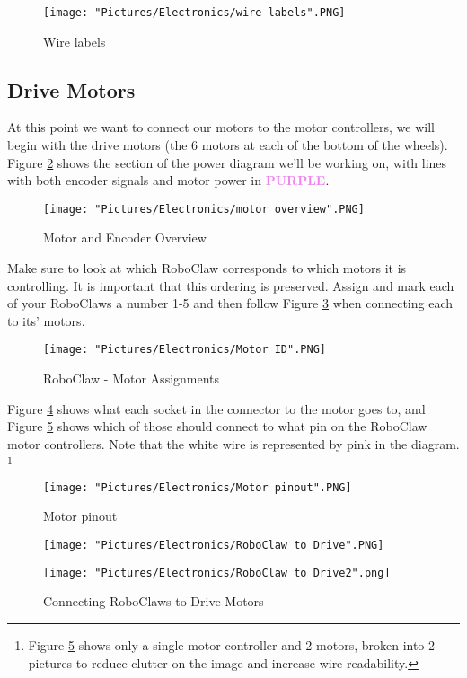 \documentclass[12pt]{article}
\begin{document}
\begin{figure}[H]
 	\centering
	\texttt{[image: "Pictures/Electronics/wire labels".PNG]}
 	\caption{Wire labels}
	\label{wire lengths}
\end{figure}

\subsection{Drive Motors}
At this point we want to connect our motors to the motor controllers, we will begin with the drive motors (the 6 motors at each of the bottom of the wheels). Figure \ref{motors over} shows the section of the power diagram we'll be working on, with lines with both encoder signals and motor power in \textcolor{violet}{\textbf{PURPLE}}.

\begin{figure}[H]
  	\centering
    	\texttt{[image: "Pictures/Electronics/motor overview".PNG]}
 	\caption{Motor and Encoder Overview}
	\label{motors over}
\end{figure}


\noindent Make sure to look at which RoboClaw corresponds to which motors it is controlling. It is important that this ordering is preserved. Assign and mark each of your RoboClaws a number 1-5 and then follow Figure \ref{motorID} when connecting each to its' motors. 

\begin{figure}[H]
 	\centering
	\texttt{[image: "Pictures/Electronics/Motor ID".PNG]}
 	\caption{RoboClaw - Motor Assignments}
	\label{motorID}
\end{figure}

Figure \ref{Motor pinout} shows what each socket in the connector to the motor goes to, and Figure \ref{RC to Drive} shows which of those should connect to what pin on the RoboClaw motor controllers. Note that the white wire is represented by pink in the diagram. \footnote{Figure \ref{RC to Drive} shows only a single motor controller and 2 motors, broken into 2 pictures to reduce clutter on the image and increase wire readability.} 

\begin{figure}[H]
 	\centering
	\texttt{[image: "Pictures/Electronics/Motor pinout".PNG]}
 	\caption{Motor pinout}
	\label{Motor pinout}
\end{figure}


\begin{figure}[H]
 	\centering
  	\begin{minipage}[b]{0.475\textwidth}
		\texttt{[image: "Pictures/Electronics/RoboClaw to Drive".PNG]}
  	\end{minipage}
  	\hfill
  	\begin{minipage}[b]{0.425\textwidth}
    		\texttt{[image: "Pictures/Electronics/RoboClaw to Drive2".png]}
  	\end{minipage}
	\caption{Connecting RoboClaws to Drive Motors}
	\label{RC to Drive}
\end{figure}
\end{document}
